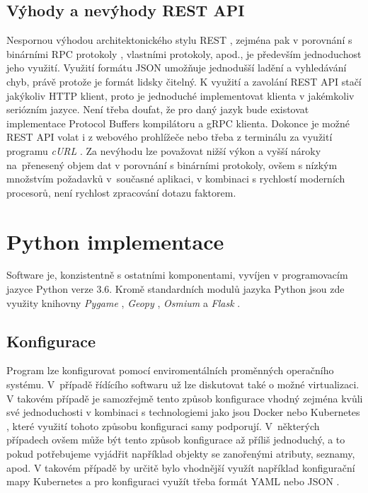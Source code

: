 \documentclass[czech, bachelor]{diploma}
\begin{document}
\subsection{Výhody a nevýhody REST API}

Nespornou výhodou architektonického stylu REST \cite{rest-source}, zejména pak v porovnání s binárními RPC
protokoly \cite{grpc-source}, vlastními protokoly, apod., je především jednoduchost jeho využití. Využití formátu
JSON \cite{json-source} umožňuje jednodušší ladění a vyhledávání chyb, právě protože je formát lidsky čitelný. K využití a zavolání
REST API stačí jakýkoliv HTTP \cite{http-source} klient, proto je jednoduché implementovat klienta v jakémkoliv seriózním jazyce.
Není třeba doufat, že pro daný jazyk bude existovat implementace Protocol Buffers \cite{protobuf-source} kompilátoru a
gRPC \cite{grpc-source} klienta. Dokonce je možné REST API volat i z webového prohlížeče nebo třeba z terminálu za využití programu
\emph{cURL} \cite{curl-source}. Za nevýhodu lze považovat nižší výkon a vyšší nároky na~přenesený objem dat v porovnání s binárními
protokoly, ovšem s nízkým množstvím požadavků v~současné aplikaci, v kombinaci s rychlostí moderních procesorů, není rychlost
zpracování dotazu faktorem.

\section{Python implementace}

Software je, konzistentně s ostatními komponentami, vyvíjen v programovacím jazyce Python verze 3.6. Kromě standardních modulů
jazyka Python jsou zde využity knihovny \emph{Pygame} \cite{pygame-source}, \emph{Geopy} \cite{geopy-source}, \emph{Osmium} \cite{
osmium-source} a \emph{Flask} \cite{flask-source}.

\subsection{Konfigurace}

Program lze konfigurovat pomocí enviromentálních proměnných operačního systému. V~případě řídícího softwaru už lze diskutovat také
o možné virtualizaci. V takovém případě je samozřejmě tento způsob konfigurace vhodný zejména kvůli své jednoduchosti v kombinaci
s technologiemi jako jsou Docker nebo Kubernetes \cite{virtualization-source}, které využití tohoto způsobu konfiguraci samy
podporují. V~některých případech ovšem může být tento způsob konfigurace až příliš jednoduchý, a to pokud potřebujeme vyjádřit
například objekty se zanořenými atributy, seznamy, apod. V takovém případě by určitě bylo vhodnější využít například konfigurační
mapy Kubernetes a pro konfiguraci využít třeba formát YAML \cite{yaml-source} nebo JSON \cite{json-source}.
\end{document}
